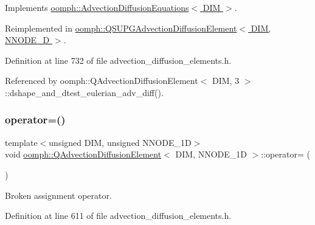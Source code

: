 Implements \hyperlink{classoomph_1_1AdvectionDiffusionEquations_a354827df2a149258310ffdd0e4c0d40b}{oomph\+::\+Advection\+Diffusion\+Equations$<$ D\+I\+M $>$}.



Reimplemented in \hyperlink{classoomph_1_1QSUPGAdvectionDiffusionElement_af77acfc13df8c460118d2c1bfbf0d74d}{oomph\+::\+Q\+S\+U\+P\+G\+Advection\+Diffusion\+Element$<$ D\+I\+M, N\+N\+O\+D\+E\+\_\+D $>$}.



Definition at line 732 of file advection\+\_\+diffusion\+\_\+elements.\+h.



Referenced by oomph\+::\+Q\+Advection\+Diffusion\+Element$<$ D\+I\+M, 3 $>$\+::dshape\+\_\+and\+\_\+dtest\+\_\+eulerian\+\_\+adv\+\_\+diff().

\mbox{\label{classoomph_1_1QAdvectionDiffusionElement_a3ae936af68a9db003914b4da44985e9c}} 
\subsubsection{\texorpdfstring{operator=()}{operator=()}}
{\footnotesize\ttfamily template$<$unsigned D\+IM, unsigned N\+N\+O\+D\+E\+\_\+1D$>$ \\
void \hyperlink{classoomph_1_1QAdvectionDiffusionElement}{oomph\+::\+Q\+Advection\+Diffusion\+Element}$<$ D\+IM, N\+N\+O\+D\+E\+\_\+1D $>$\+::operator= (\begin{DoxyParamCaption}\item[{const \hyperlink{classoomph_1_1QAdvectionDiffusionElement}{Q\+Advection\+Diffusion\+Element}$<$ D\+IM, N\+N\+O\+D\+E\+\_\+1D $>$ \&}]{ }\end{DoxyParamCaption})\hspace{0.3cm}{\ttfamily [inline]}}



Broken assignment operator. 



Definition at line 611 of file advection\+\_\+diffusion\+\_\+elements.\+h.

\mbox{\label{classoomph_1_1QAdvectionDiffusionElement_af30152cc8ea671b103239fc6b3e506ce}} 
